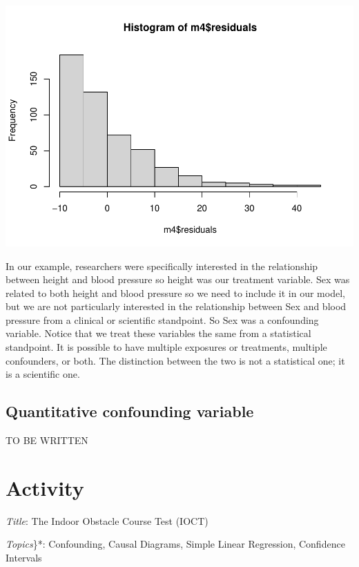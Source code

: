 \documentclass[]{book}
\begin{document}
\includegraphics{MA206supplement_files/figure-latex/unnamed-chunk-15-1.pdf}

In our example, researchers were specifically interested in the relationship between height and blood pressure so height was our treatment variable. Sex was related to both height and blood pressure so we need to include it in our model, but we are not particularly interested in the relationship between Sex and blood pressure from a clinical or scientific standpoint. So Sex was a confounding variable. Notice that we treat these variables the same from a statistical standpoint. It is possible to have multiple exposures or treatments, multiple confounders, or both. The distinction between the two is not a statistical one; it is a scientific one.\\

\hypertarget{quantitative-confounding-variable}{%
\section{Quantitative confounding variable}\label{quantitative-confounding-variable}}

TO BE WRITTEN

\hypertarget{activity}{%
\chapter{Activity}\label{activity}}

\emph{Title}: The Indoor Obstacle Course Test (IOCT)

\emph{Topics}\}*: Confounding, Causal Diagrams, Simple Linear Regression, Confidence Intervals
\end{document}

